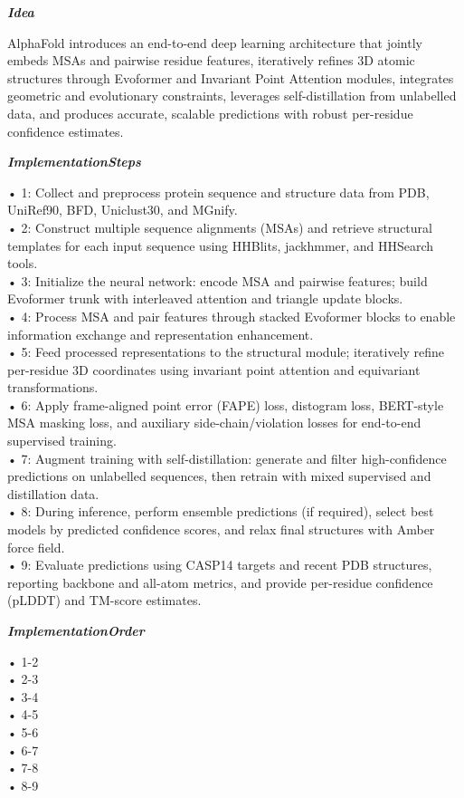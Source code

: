 \begin{tcolorbox}[
    breakable,
    title={Example of Idea Generation in Life},
    colback=LighterGray,
    colframe=DeepPurple,
    colbacktitle=DeepPurple,
    coltitle=White,
]
\textbf{\emph{\textcolor{CaseOrange}{Idea}}}

AlphaFold introduces an end-to-end deep learning architecture that jointly embeds MSAs and pairwise
residue features, iteratively refines 3D atomic structures through Evoformer and Invariant Point
Attention modules, integrates geometric and evolutionary constraints, leverages self-distillation
from unlabelled data, and produces accurate, scalable predictions with robust per-residue confidence
estimates.

\textbf{\emph{\textcolor{CaseOrange}{ImplementationSteps}}}

• 1: Collect and preprocess protein sequence and structure data from PDB, UniRef90, BFD, Uniclust30, and MGnify. \\
• 2: Construct multiple sequence alignments (MSAs) and retrieve structural templates for each input sequence using HHBlits, jackhmmer, and HHSearch tools. \\
• 3: Initialize the neural network: encode MSA and pairwise features; build Evoformer trunk with interleaved attention and triangle update blocks. \\
• 4: Process MSA and pair features through stacked Evoformer blocks to enable information exchange and representation enhancement. \\
• 5: Feed processed representations to the structural module; iteratively refine per-residue 3D coordinates using invariant point attention and equivariant transformations. \\
• 6: Apply frame-aligned point error (FAPE) loss, distogram loss, BERT-style MSA masking loss, and auxiliary side-chain/violation losses for end-to-end supervised training. \\
• 7: Augment training with self-distillation: generate and filter high-confidence predictions on unlabelled sequences, then retrain with mixed supervised and distillation data. \\
• 8: During inference, perform ensemble predictions (if required), select best models by predicted confidence scores, and relax final structures with Amber force field. \\
• 9: Evaluate predictions using CASP14 targets and recent PDB structures, reporting backbone and all-atom metrics, and provide per-residue confidence (pLDDT) and TM-score estimates. 

\textbf{\emph{\textcolor{CaseOrange}{ImplementationOrder}}}

• 1-2 \\
• 2-3 \\
• 3-4 \\
• 4-5 \\
• 5-6 \\
• 6-7 \\
• 7-8 \\
• 8-9 


\end{tcolorbox}
